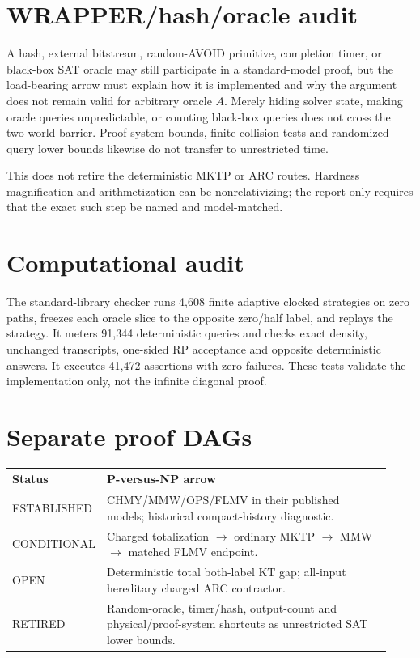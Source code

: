 \documentclass[11pt]{article}
\begin{document}
\section*{WRAPPER/hash/oracle audit}
A hash, external bitstream, random-AVOID primitive, completion timer, or
black-box SAT oracle may still participate in a standard-model proof, but the
load-bearing arrow must explain how it is implemented and why the argument
does not remain valid for arbitrary oracle $A$.  Merely hiding solver state,
making oracle queries unpredictable, or counting black-box queries does not
cross the two-world barrier.  Proof-system bounds, finite collision tests and
randomized query lower bounds likewise do not transfer to unrestricted time.

This does not retire the deterministic MKTP or ARC routes.  Hardness
magnification and arithmetization can be nonrelativizing; the report only
requires that the exact such step be named and model-matched.

\section*{Computational audit}
The standard-library checker runs 4,608 finite adaptive clocked strategies on
zero paths, freezes each oracle slice to the opposite zero/half label, and
replays the strategy.  It meters 91,344 deterministic queries and checks
exact density, unchanged transcripts, one-sided RP acceptance and opposite
deterministic answers.  It executes 41,472 assertions with zero failures.
These tests validate the implementation only, not the infinite diagonal proof.

\section*{Separate proof DAGs}
\begin{tabular}{p{0.18\linewidth}p{0.75\linewidth}}
\toprule
Status & P-versus-NP arrow \\
\midrule
ESTABLISHED & CHMY/MMW/OPS/FLMV in their published models; historical
compact-history diagnostic. \\
CONDITIONAL & Charged totalization $\to$ ordinary MKTP $\to$ MMW $\to$
matched FLMV endpoint. \\
OPEN & Deterministic total both-label KT gap; all-input hereditary charged ARC
contractor. \\
RETIRED & Random-oracle, timer/hash, output-count and physical/proof-system
shortcuts as unrestricted SAT lower bounds. \\
\bottomrule
\end{tabular}
\end{document}
